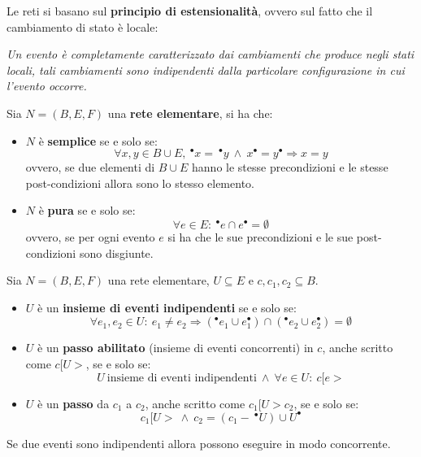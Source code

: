 Le reti si basano sul \textbf{principio di estensionalità}, ovvero sul fatto che
il cambiamento di stato è locale:
\begin{center}
    \textit{Un evento è completamente caratterizzato dai cambiamenti che produce
        negli stati locali, tali cambiamenti sono indipendenti dalla particolare
        configurazione in cui l'evento occorre.}
\end{center}
\begin{definizione}[]
    Sia $N = (B, E, F)$ una \textbf{rete elementare}, si ha che:
    \begin{itemize}
        \item $N$ è \textbf{semplice} se e solo se:
              \begin{equation}
                  \forall x, y \in B \cup E, \ ^{\bullet} x = \ ^{\bullet} y \
                  \land \ x^{\bullet} = y^{\bullet} \Rightarrow x = y
              \end{equation}
              ovvero, se due elementi di $B \cup E$ hanno le stesse precondizioni
              e le stesse post-condizioni allora sono lo stesso elemento.
        \item $N$ è \textbf{pura} se e solo se:
              \begin{equation}
                  \forall e \in E: \ ^{\bullet}e \cap e^{\bullet} = \emptyset
              \end{equation}
              ovvero, se per ogni evento $e$ si ha che le sue precondizioni e le
              sue post-condizioni sono disgiunte.
    \end{itemize}
\end{definizione}
\begin{definizione}
    Sia $N = (B, E, F)$ una rete elementare, $U \subseteq E$ e $c, c_1, c_2 \subseteq B$.
    \begin{itemize}
        \item $U$ è un \textbf{insieme di eventi indipendenti} se e solo se:
              \begin{equation}
                  \forall e_1, e_2 \in U: \ e_1 \neq e_2 \Rightarrow (^{\bullet}e_1
                  \cup e_1^{\bullet}) \cap (^{\bullet}e_2 \cup e_2^{\bullet}) = \emptyset
              \end{equation}
        \item $U$ è un \textbf{passo abilitato} (insieme di eventi concorrenti)
              in $c$, anche scritto come $c[U >$, se e solo se:
              \begin{equation}
                  U \ \text{insieme di eventi indipendenti} \ \land \ \forall e
                  \in U: \ c[e >
              \end{equation}
        \item $U$ è un \textbf{passo} da $c_1$ a $c_2$, anche scritto come
              $c_1[U > c_2$, se e solo se:
              \begin{equation}
                  c_1 [ U > \ \land \ c_2 = (c_1 - \ ^{\bullet} U) \cup U^{\bullet}
              \end{equation}
    \end{itemize}
    Se due eventi sono indipendenti allora possono eseguire in modo concorrente.
\end{definizione}
